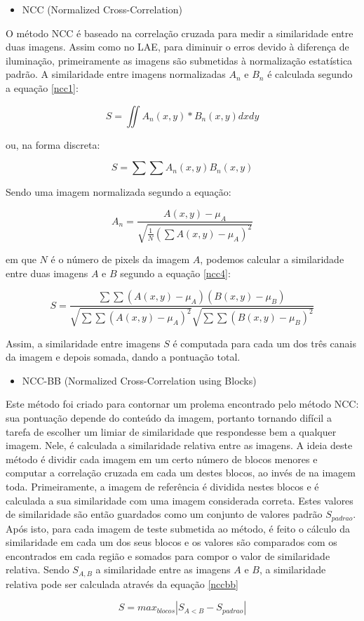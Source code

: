 \begin{itemize}
\item NCC (Normalized Cross-Correlation)
\end{itemize}

O método NCC é baseado na correlação cruzada para medir a similaridade entre duas imagens. Assim como no LAE, para diminuir o erros devido à diferença de iluminação, primeiramente as imagens são submetidas à normalização estatística padrão. A similaridade entre imagens normalizadas $A_n$ e $B_n$ é calculada segundo a equação \ref{ncc1}:

\begin{equation}
S = \iint A_n(x,y)*B_n(x,y) dx dy \label{ncc1} 
\end{equation}

ou, na forma discreta:

\begin{equation}
S = \sum \sum A_n(x,y)B_n(x,y) \label{ncc2} 
\end{equation} 


Sendo uma imagem normalizada segundo a equação:

\begin{equation}
A_n = \frac {A(x,y) - \mu_A}{\sqrt {\frac{1}{N}(\sum {A(x,y)-\mu_A})^2}} \label{ncc3} 
\end{equation} 

em que $N$ é o número de pixels da imagem $A$, podemos calcular a similaridade entre duas imagens $A$ e $B$ segundo a equação \ref{ncc4}:

\begin{equation}
S = \frac{\sum \sum (A(x,y)-\mu _A)(B(x,y)-\mu _B)}{\sqrt{\sum \sum (A(x,y)-\mu _A)^2}\sqrt{\sum \sum (B(x,y)-\mu _B)^2}}
\label{ncc4}
\end{equation}

Assim, a similaridade entre imagens $S$ é computada para cada um dos três canais da imagem e depois somada, dando a pontuação total.

\begin{itemize}
\item NCC-BB (Normalized Cross-Correlation using Blocks)
\end{itemize}

Este método foi criado para contornar um prolema encontrado pelo método NCC: sua pontuação depende do conteúdo da imagem, portanto tornando difícil a tarefa de escolher um limiar de similaridade que respondesse bem a qualquer imagem. Nele, é calculada a similaridade relativa entre as imagens.
A ideia deste método é dividir cada imagem em um certo número de blocos menores e computar a correlação cruzada em cada um destes blocos, ao invés de na imagem toda. Primeiramente, a imagem de referência é dividida nestes blocos e é calculada a sua similaridade com uma imagem considerada correta. Estes valores de similaridade são então guardados como um conjunto de valores padrão $S_{padrao}$.
Após isto, para cada imagem de teste submetida ao método, é feito o cálculo da similaridade em cada um dos seus blocos e os valores são comparados com os encontrados em cada região e somados para compor o valor de similaridade relativa. Sendo $S_{A,B}$ a similaridade entre as imagens $A$ e $B$, a similaridade relativa pode ser calculada através da equação \ref{nccbb}

\begin{equation}
S = max_{blocos}|S_{A<B} - S_{padrao}| \label{nccbb}
\end{equation}

